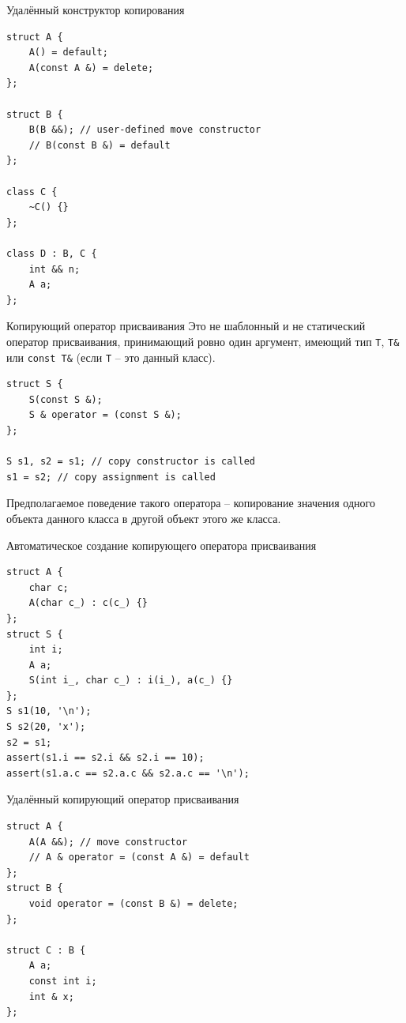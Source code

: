 \documentclass[unknownkeysallowed,xcolor=table]{beamer}
\begin{document}
\begin{frame}[fragile]{Удалённый конструктор копирования}
\begin{lstlisting}
struct A {
    A() = default;
    A(const A &) = delete;
};

struct B {
    B(B &&); // user-defined move constructor
    // B(const B &) = default
};

class C {
    ~C() {}
};

class D : B, C {
    int && n;
    A a;
};
\end{lstlisting}
\end{frame}

\begin{frame}[fragile]{Копирующий оператор присваивания}
Это не шаблонный и не статический оператор присваивания, принимающий ровно один аргумент, имеющий тип \lstinline{T}, \lstinline{T&} или \lstinline{const T&} (если \lstinline{T} -- это данный класс).

\vspace{1em}

\begin{lstlisting}
struct S {
    S(const S &);
    S & operator = (const S &);
};

S s1, s2 = s1; // copy constructor is called
s1 = s2; // copy assignment is called
\end{lstlisting}
\vspace{1em}

Предполагаемое поведение такого оператора -- копирование значения одного объекта данного класса в другой объект этого же класса.
\end{frame}

\begin{frame}[fragile]{Автоматическое создание копирующего оператора присваивания}
\begin{lstlisting}
struct A {
    char c;
    A(char c_) : c(c_) {}
};
struct S {
    int i;
    A a;
    S(int i_, char c_) : i(i_), a(c_) {}
};
S s1(10, '\n');
S s2(20, 'x');
s2 = s1;
assert(s1.i == s2.i && s2.i == 10);
assert(s1.a.c == s2.a.c && s2.a.c == '\n');
\end{lstlisting}
\end{frame}

\begin{frame}[fragile]{Удалённый копирующий оператор присваивания}
\begin{lstlisting}
struct A {
    A(A &&); // move constructor
    // A & operator = (const A &) = default
};
struct B {
    void operator = (const B &) = delete;
};

struct C : B {
    A a;
    const int i;
    int & x;
};
\end{lstlisting}
\end{frame}
\end{document}
